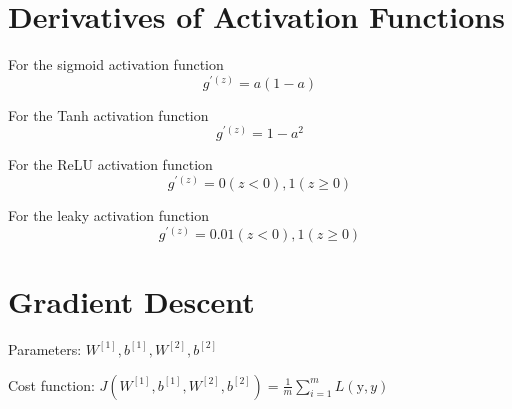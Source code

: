 \documentclass{article}
\begin{document}
    \section{Derivatives of Activation Functions}
     
    For the sigmoid activation function
    \begin{equation}
        g^{'(z)} = a(1 - a)
    \end{equation}

    For the Tanh activation function
    \begin{equation}
        g^{'(z)} = 1 - a^2
    \end{equation}

    For the ReLU activation function
    \begin{equation}
        g^{'(z)} = 0 (z < 0), 1 (z \geq 0)
    \end{equation}

    For the leaky activation function
    \begin{equation}
        g^{'(z)} = 0.01 (z < 0), 1 (z \geq 0)
    \end{equation}

    \section{Gradient Descent}
    
    Parameters: $W^{[1]}, b^{[1]}, W^{[2]}, b^{[2]}$
    
    Cost function: $J(W^{[1]}, b^{[1]}, W^{[2]}, b^{[2]}) = \frac{1}{m} \sum_{i=1}^m L(\textrm{y}, y)$
    
\end{document}
